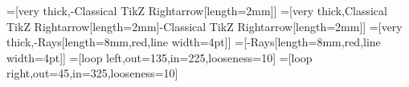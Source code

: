 \usepackage[utf8]{inputenc}
\usepackage[english]{babel}
\usepackage[hyphens]{url}
\usepackage{doi}
\usepackage{hyperref}
\usepackage{amsmath}
\usepackage{amssymb}
\usepackage{amsthm}
\usepackage{tikz}
\usepackage{natbib}
\usepackage{fancyhdr} %
\usepackage{textcomp} %
\usepackage{algorithm}
\usepackage{algpseudocode} %

\usepackage{minted}

\usetikzlibrary{arrows.meta}
=[very thick,-{Classical TikZ Rightarrow[length=2mm]}]
=[very thick,{Classical TikZ Rightarrow[length=2mm]}-{Classical TikZ Rightarrow[length=2mm]}]
=[very thick,-{Rays[length=8mm,red,line width=4pt]}]
=[-{Rays[length=8mm,red,line width=4pt]}]
=[loop left,out=135,in=225,looseness=10]
=[loop right,out=45,in=325,looseness=10]


\newcommand{\inlineslide}[1]{
    \refstepcounter{inlineslides}
    \pagebreak[3]\vspace{1em}\noindent
    \fbox{
      \begin{minipage}[t]{9cm}
        \begin{center}
          \includeslide[width=9cm,page=0]{#1} \\
        \end{center}
      \end{minipage}
    }
    \hspace{1em}\textsf{Slide \theinlineslides} \par\vspace{1em}\pagebreak[3]
}
\def\inlineslidesautorefname{Slide}%


